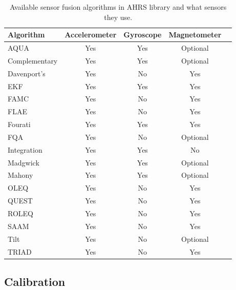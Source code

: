 \begin{table}
  \begin{center}
    \begin{tabular}[t]{lcccc}
      \hline
      Algorithm     & Accelerometer & Gyroscope & Magnetometer \\
      \hline
      AQUA          & Yes           & Yes       & Optional     \\
      Complementary & Yes           & Yes       & Optional     \\
      Davenport's   & Yes           & No        & Yes          \\
      EKF           & Yes           & Yes       & Yes          \\
      FAMC          & Yes           & No        & Yes          \\
      FLAE          & Yes           & No        & Yes          \\
      Fourati       & Yes           & Yes       & Yes          \\
      FQA           & Yes           & No        & Optional     \\
      Integration   & Yes           & Yes       & No           \\
      Madgwick      & Yes           & Yes       & Optional     \\
      Mahony        & Yes           & Yes       & Optional     \\
      OLEQ          & Yes           & No        & Yes          \\
      QUEST         & Yes           & No        & Yes          \\
      ROLEQ         & Yes           & No        & Yes          \\
      SAAM          & Yes           & No        & Yes          \\
      Tilt          & Yes           & No        & Optional     \\
      TRIAD         & Yes           & No        & Yes          \\
      \hline
    \end{tabular}
    \caption{Available sensor fusion algorithms in AHRS library and what sensors they use. \cite{ahrs}}
    \label{tab:ahrs_algorithms}
  \end{center}
\end{table}

\subsection{Calibration}

